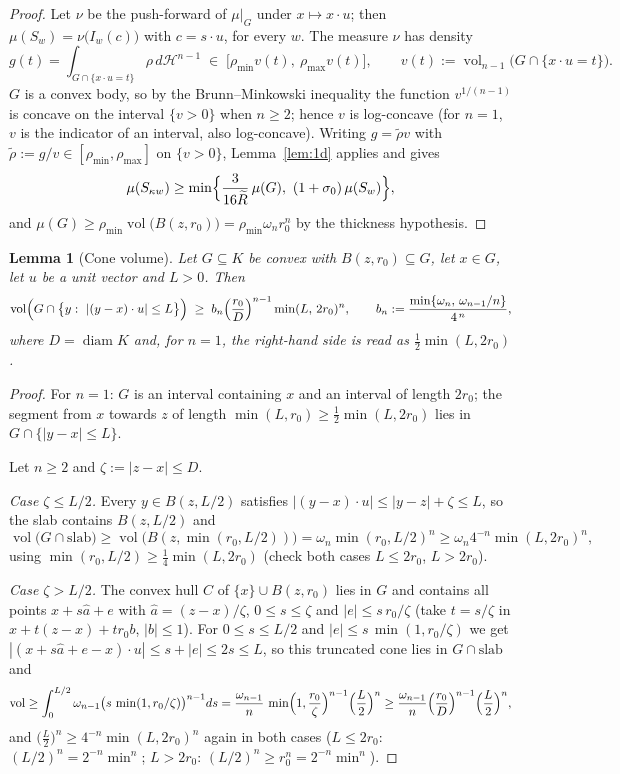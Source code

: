 \documentclass[11pt]{article}
\newtheorem{lemma}[theorem]{Lemma}
\newcommand{\vol}{\operatorname{vol}}
\newcommand{\diam}{\operatorname{diam}}
\begin{document}
\begin{proof}
Let $\nu$ be the push-forward of $\mu|_G$ under $x\mapsto x\cdot u$; then
$\mu(S_w)=\nu\bigl(I_w(c)\bigr)$ with $c=s\cdot u$, for every $w$.  The measure
$\nu$ has density
\[
g(t)=\int_{G\cap\{x\cdot u=t\}}\rho\,d\mathcal H^{n-1}
\;\in\;\bigl[\rho_{\min}v(t),\ \rho_{\max}v(t)\bigr],
\qquad
v(t):=\vol_{n-1}\bigl(G\cap\{x\cdot u=t\}\bigr).
\]
$G$ is a convex body, so by the Brunn--Minkowski inequality
\cite[Section 5]{Gardner} the function $v^{1/(n-1)}$ is concave on the interval
$\{v>0\}$ when $n\ge2$; hence $v$ is log-concave (for $n=1$, $v$ is the indicator of
an interval, also log-concave).  Writing $g=\tilde\rho v$ with
$\tilde\rho:=g/v\in[\rho_{\min},\rho_{\max}]$ on $\{v>0\}$,
Lemma~\ref{lem:1d} applies and gives
\[
\mu(S_{\kappa w})\ge\min\Bigl\{\frac{3}{16\widetilde R}\,\mu(G),\
(1+\sigma_0)\,\mu(S_w)\Bigr\},
\]
and $\mu(G)\ge\rho_{\min}\vol\bigl(B(z,r_0)\bigr)=\rho_{\min}\omega_nr_0^n$ by the
thickness hypothesis.
\end{proof}

\begin{lemma}[Cone volume]\label{lem:cone}
Let $G\subseteq K$ be convex with $B(z,r_0)\subseteq G$, let $x\in G$, let $u$ be a
unit vector and $L>0$.  Then
\[
\vol\Bigl(G\cap\bigl\{y:\ |(y-x)\cdot u|\le L\bigr\}\Bigr)
\;\ge\;
b_n\Bigl(\frac{r_0}{D}\Bigr)^{n-1}\min(L,\,2r_0)^n,
\qquad
b_n:=\frac{\min\{\omega_n,\,\omega_{n-1}/n\}}{4^{\,n}},
\]
where $D=\diam K$ and, for $n=1$, the right-hand side is read as
$\tfrac12\min(L,2r_0)$.
\end{lemma}

\begin{proof}
For $n=1$: $G$ is an interval containing $x$ and an interval of length $2r_0$; the
segment from $x$ towards $z$ of length $\min(L,r_0)\ge\frac12\min(L,2r_0)$ lies in
$G\cap\{|y-x|\le L\}$.

Let $n\ge2$ and $\zeta:=|z-x|\le D$.

\emph{Case $\zeta\le L/2$.}  Every $y\in B(z,L/2)$ satisfies
$|(y-x)\cdot u|\le|y-z|+\zeta\le L$, so the slab contains $B(z,L/2)$ and
\[
\vol\bigl(G\cap\text{slab}\bigr)\ge\vol\bigl(B(z,\min(r_0,L/2))\bigr)
=\omega_n\min(r_0,L/2)^n\ge\omega_n4^{-n}\min(L,2r_0)^n,
\]
using $\min(r_0,L/2)\ge\frac14\min(L,2r_0)$ (check both cases $L\le2r_0$, $L>2r_0$).

\emph{Case $\zeta>L/2$.}  The convex hull $C$ of $\{x\}\cup B(z,r_0)$ lies in $G$ and
contains all points $x+s\hat a+e$ with $\hat a=(z-x)/\zeta$, $0\le s\le\zeta$ and
$|e|\le s\,r_0/\zeta$ (take $t=s/\zeta$ in $x+t(z-x)+tr_0b$, $|b|\le1$).  For
$0\le s\le L/2$ and $|e|\le s\,\min(1,r_0/\zeta)$ we get
$|(x+s\hat a+e-x)\cdot u|\le s+|e|\le2s\le L$, so this truncated cone lies in
$G\cap\text{slab}$ and
\[
\vol\ge\int_0^{L/2}\omega_{n-1}\bigl(s\,\min(1,r_0/\zeta)\bigr)^{n-1}ds
=\frac{\omega_{n-1}}{n}\,\min\Bigl(1,\frac{r_0}{\zeta}\Bigr)^{n-1}
\Bigl(\frac L2\Bigr)^n
\ge\frac{\omega_{n-1}}{n}\Bigl(\frac{r_0}{D}\Bigr)^{n-1}\Bigl(\frac L2\Bigr)^n,
\]
and $\bigl(\frac L2\bigr)^n\ge4^{-n}\min(L,2r_0)^n$ again in both cases
($L\le2r_0$: $(L/2)^n=2^{-n}\min^n$; $L>2r_0$: $(L/2)^n\ge r_0^n=2^{-n}\min^n$).
\end{proof}
\end{document}
